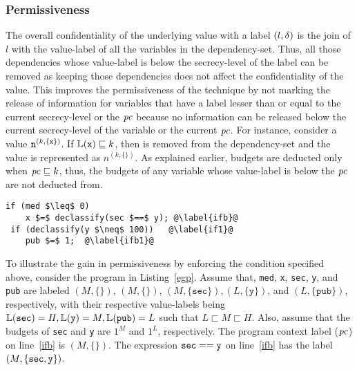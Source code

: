 
\subsubsection{\textbf{Permissiveness}}
\label{aspect:perm}
The overall confidentiality of the underlying value with a
label $(l, \delta)$ is the join of $l$ with the value-label of all the
variables in the dependency-set. Thus, all those dependencies whose 
value-label is below the secrecy-level of the label can be removed as 
keeping those dependencies does not affect the confidentiality of the
value. This improves the permissiveness of the technique by not
marking the release of information for variables that have a label
lesser than or equal to the current secrecy-level or the $\mathit{pc}$
because no information can be released below the current secrecy-level 
of the variable or the current $\mathit{pc}$. For instance, consider a 
value $\texttt{n}^{(k, \{\texttt{x}\})}$. If $\mathbb{L}(\texttt{x}) \sqsubseteq k$, 
then  is removed from the dependency-set and the value is
represented as $n^{(k, \{\})}$. As explained earlier, budgets are
deducted only when $\mathit{pc} \sqsubseteq k$, thus, the budgets of any
variable whose value-label is below the $\mathit{pc}$ are not deducted from.  
 
\begin{lstlisting}[float,caption=Example to illustrate permissiveness,label=egp]
 if (med $\leq$ 0) 
    x $=$ declassify(sec $==$ y); @\label{ifb}@
 if (declassify(y $\neq$ 100))   @\label{if1}@
    pub $=$ 1;  @\label{ifb1}@
\end{lstlisting}

To illustrate the gain in permissiveness by enforcing the condition
specified above, consider the program in Listing~\ref{egp}. Assume
that, \texttt{med}, \texttt{x}, \texttt{sec}, \texttt{y}, and
\texttt{pub}  are labeled $(M, \{\})$, $(M, \{\})$, $(M,
\{\texttt{sec}\}), (L, \{\texttt{y}\})$, and $(L, \{\texttt{pub}\})$,
respectively, with their respective value-labels being
$\mathbb{L}(\texttt{sec}) = H, \mathbb{L}(\texttt{y}) = M, 
\mathbb{L}(\texttt{pub}) = L$ such that $L \sqsubset M \sqsubset
H$. Also, assume that the budgets of \texttt{sec} and \texttt{y} are
$1^M$ and $1^L$, respectively. The program context label ($\mathit{pc}$) on
line~\ref{ifb} is $(M, \{\})$. The expression 
$\texttt{sec} == \texttt{y}$ on line~\ref{ifb} has the label $(M, \{\texttt{sec},
\texttt{y} \})$.

